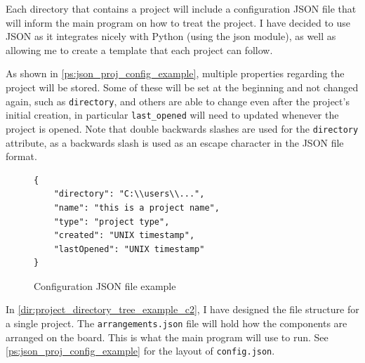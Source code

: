 \documentclass[11pt]{article}
\begin{document}

                
                Each directory that contains a project will include a configuration JSON file that will inform the main program on how to treat the project. I have decided to use JSON as it integrates nicely with Python (using the json module), as well as allowing me to create a template that each project can follow. 


                As shown in \autoref{ps:json_proj_config_example}, multiple properties regarding the project will be stored. Some of these will be set at the beginning and not changed again, such as \verb|directory|, and others are able to change even after the project's initial creation, in particular \verb|last_opened| will need to updated whenever the project is opened. Note that double backwards slashes are used for the \verb|directory| attribute, as a backwards slash is used as an escape character in the JSON file format.

                \begin{figure}[!ht]
                    \begin{verbatim}
{
    "directory": "C:\\users\\...",
    "name": "this is a project name",
    "type": "project type",
    "created": "UNIX timestamp",
    "lastOpened": "UNIX timestamp"
}
                    \end{verbatim}
                    \caption{Configuration JSON file example}
                    \label{ps:json_proj_config_example}
                \end{figure}


                In \autoref{dir:project_directory_tree_example_c2}, I have designed the file structure for a single project. 
                The \verb|arrangements.json| file will hold how the components are arranged on the board. This is what the main program will use to run. 
                See \autoref{ps:json_proj_config_example} for the layout of \verb|config.json|.
\end{document}

